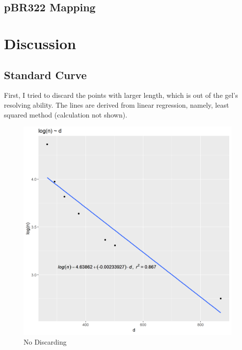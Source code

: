 \documentclass{article}
\begin{document}
        \subsection{pBR322 Mapping}

    
    \section{Discussion}
        \subsection{Standard Curve}
            First, I tried to discard the points with larger length, which is out of the gel's resolving ability. The lines are derived from linear regression, namely, least squared method (calculation not shown).
            \begin{figure}[H]
                \begin{minipage}[t]{0.5\textwidth}
                    \centering
                    \includegraphics[width = 0.8\linewidth]{../Data/discard_1.png}
                    \caption{No Discarding}
                    \label{dis.0}
                \end{minipage}
                \begin{minipage}[t]{0.5\textwidth}
                    \centering

\end{minipage}
\end{figure}
\end{document}
